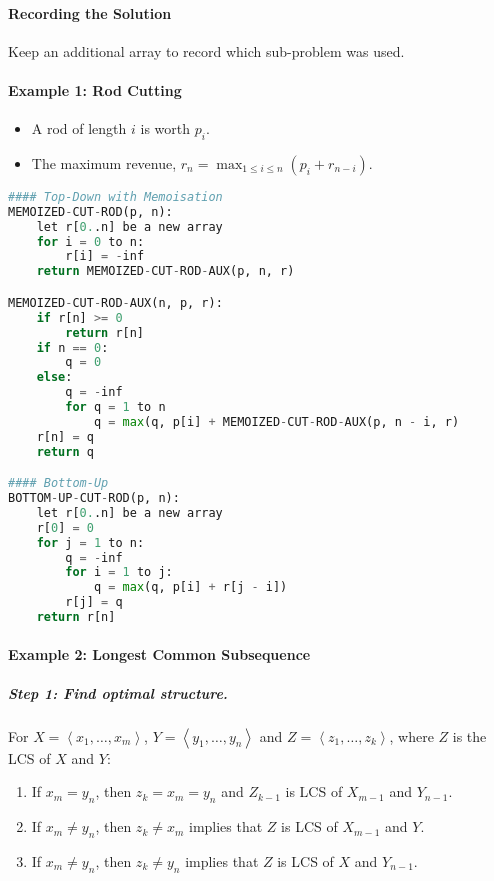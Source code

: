 \documentclass[twocolumn,english]{article}
\begin{document}
\paragraph{Recording the Solution}

Keep an additional array to record which sub-problem was used.

\paragraph{Example 1: Rod Cutting}
\begin{itemize}
\item A rod of length $i$ is worth $p_{i}$.
\item The maximum revenue, $r_{n}=\max_{1\leq i\leq n}\left(p_{i}+r_{n-i}\right)$.
\end{itemize}
\begin{lstlisting}[language=Python,basicstyle={\footnotesize\ttfamily},tabsize=4,frame=single]
#### Top-Down with Memoisation
MEMOIZED-CUT-ROD(p, n):
	let r[0..n] be a new array
	for i = 0 to n:
		r[i] = -inf
	return MEMOIZED-CUT-ROD-AUX(p, n, r)

MEMOIZED-CUT-ROD-AUX(n, p, r):
	if r[n] >= 0
		return r[n]
	if n == 0:
		q = 0
	else:
		q = -inf
		for q = 1 to n
			q = max(q, p[i] + MEMOIZED-CUT-ROD-AUX(p, n - i, r)
	r[n] = q
	return q

#### Bottom-Up
BOTTOM-UP-CUT-ROD(p, n):
	let r[0..n] be a new array
	r[0] = 0
	for j = 1 to n:
		q = -inf
		for i = 1 to j:
			q = max(q, p[i] + r[j - i])
		r[j] = q
	return r[n]
\end{lstlisting}

\paragraph{Example 2: Longest Common Subsequence}

\subparagraph{Step 1: Find optimal structure.}

For $X=\left\langle x_{1},\dots,x_{m}\right\rangle $, $Y=\left\langle y_{1},\dots,y_{n}\right\rangle $
and $Z=\left\langle z_{1},\dots,z_{k}\right\rangle $, where $Z$
is the LCS of $X$ and $Y$:
\begin{enumerate}
\item If $x_{m}=y_{n}$, then $z_{k}=x_{m}=y_{n}$ and $Z_{k-1}$ is LCS
of $X_{m-1}$ and $Y_{n-1}$.
\item If $x_{m}\neq y_{n}$, then $z_{k}\neq x_{m}$ implies that $Z$ is
LCS of $X_{m-1}$ and $Y$.
\item If $x_{m}\neq y_{n}$, then $z_{k}\neq y_{n}$ implies that $Z$ is
LCS of $X$ and $Y_{n-1}$.
\end{enumerate}
\end{document}
